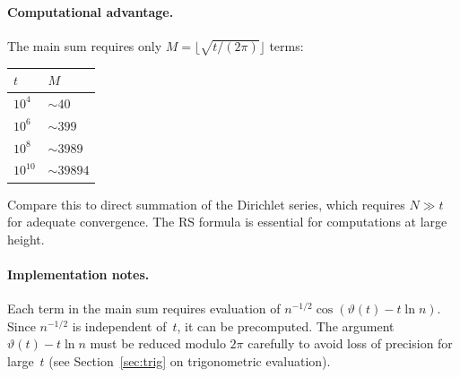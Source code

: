\paragraph{Computational advantage.}
The main sum requires only $M = \lfloor\sqrt{t/(2\pi)}\rfloor$ terms:
\begin{center}
\begin{tabular}{@{}ll@{}}
\toprule
$t$ & $M$ \\
\midrule
$10^4$ & $\sim 40$ \\
$10^6$ & $\sim 399$ \\
$10^8$ & $\sim 3989$ \\
$10^{10}$ & $\sim 39894$ \\
\bottomrule
\end{tabular}
\end{center}
Compare this to direct summation of the Dirichlet series, which requires $N \gg t$ for
adequate convergence. The RS formula is essential for computations at large height.

\paragraph{Implementation notes.}
Each term in the main sum requires evaluation of
$n^{-1/2}\cos(\vartheta(t) - t\ln n)$. Since $n^{-1/2}$ is independent of~$t$, it can
be precomputed. The argument $\vartheta(t) - t\ln n$ must be reduced modulo $2\pi$
carefully to avoid loss of precision for large~$t$ (see Section~\ref{sec:trig} on
trigonometric evaluation).

